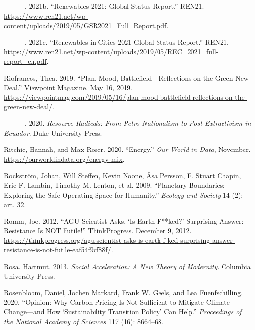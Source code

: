 \documentclass[a4paper, nobind]{templates/ociamthesis}
\newlength{\cslhangindent}
\newenvironment{CSLReferences}[2] %
 {%
  \setlength{\parindent}{0pt}
  \ifodd #1
  \let\oldpar\par
  \def\par{\hangindent=\cslhangindent\oldpar}
  \fi
  \setlength{\parskip}{1mm}
  \setlength{\baselineskip}{6mm}
 }%
 {}
\begin{document}
\begin{CSLReferences}{1}{0}
\leavevmode{}%
---------. 2021b. {``Renewables 2021: {Global Status Report}.''} {REN21}. \url{https://www.ren21.net/wp-content/uploads/2019/05/GSR2021_Full_Report.pdf}.

\leavevmode{}%
---------. 2021c. {``Renewables in {Cities} 2021 {Global Status Report}.''} {REN21}. \url{https://www.ren21.net/wp-content/uploads/2019/05/REC_2021_full-report_en.pdf}.

\leavevmode{}%
Riofrancos, Thea. 2019. {``Plan, {Mood}, {Battlefield} - {Reflections} on the {Green New Deal}.''} {Viewpoint Magazine}. May 16, 2019. \url{https://viewpointmag.com/2019/05/16/plan-mood-battlefield-reflections-on-the-green-new-deal/}.

\leavevmode{}%
---------. 2020. \emph{Resource Radicals: {From} Petro-Nationalism to Post-Extractivism in {Ecuador}}. {Duke University Press}.

\leavevmode{}%
Ritchie, Hannah, and Max Roser. 2020. {``Energy.''} \emph{Our World in Data}, November. \url{https://ourworldindata.org/energy-mix}.

\leavevmode{}%
Rockström, Johan, Will Steffen, Kevin Noone, Åsa Persson, F. Stuart Chapin, Eric F. Lambin, Timothy M. Lenton, et al. 2009. {``Planetary {Boundaries}: {Exploring} the {Safe Operating Space} for {Humanity}.''} \emph{Ecology and Society} 14 (2): art. 32.

\leavevmode{}%
Romm, Joe. 2012. {``{AGU Scientist Asks}, {`{Is Earth F}**ked?'} {Surprising Answer}: {Resistance} Is {NOT Futile}!''} {ThinkProgress}. December 9, 2012. \url{https://thinkprogress.org/agu-scientist-asks-is-earth-f-ked-surprising-answer-resistance-is-not-futile-eaf54f9cf88f/}.

\leavevmode{}%
Rosa, Hartmut. 2013. \emph{Social {Acceleration}: {A New Theory} of {Modernity}}. {Columbia University Press}.

\leavevmode{}%
Rosenbloom, Daniel, Jochen Markard, Frank W. Geels, and Lea Fuenfschilling. 2020. {``Opinion: {Why} Carbon Pricing Is Not Sufficient to Mitigate Climate Change---and How {`Sustainability Transition Policy'} Can Help.''} \emph{Proceedings of the National Academy of Sciences} 117 (16): 8664--68.


\end{CSLReferences}
\end{document}

